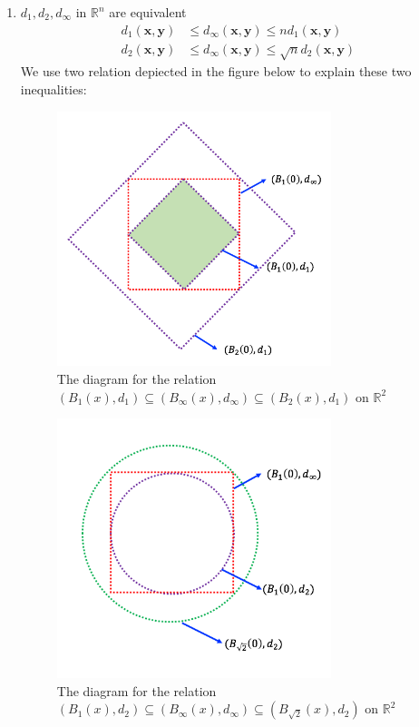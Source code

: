 \begin{example}
\begin{enumerate}
\item
$d_1,d_2,d_\infty$ in $\mathbb{R}^n$ are equivalent
\begin{align*}
d_1(\bm x,\bm y)&\le d_\infty(\bm x,\bm y)\le nd_1(\bm x,\bm y)\\
d_2(\bm x,\bm y)&\le d_\infty(\bm x,\bm y)\le\sqrt{n}d_2(\bm x,\bm y)
\end{align*}
We use two relation depiected in the figure below to explain these two inequalities:
\begin{figure}[H]
\centering
\includegraphics[width=8cm]{week1/f_3_2}
\caption{The diagram for the relation $(B_1(x),d_1)\subseteq(B_\infty(x),d_\infty)\subseteq (B_2(x),d_1)$ on $\mathbb{R}^2$}
\end{figure}
\begin{figure}[H]
\centering
\includegraphics[width=8cm]{week1/f_3_3}
\caption{The diagram for the relation $(B_1(x),d_2)\subseteq(B_\infty(x),d_\infty)\subseteq (B_{\sqrt{2}}(x),d_2)$ on $\mathbb{R}^2$}
\end{figure}

\end{enumerate}
\end{example}
